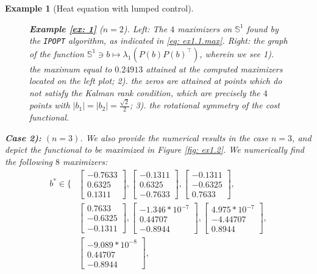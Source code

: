 \documentclass[journal,twoside,web]{ieeecolor}
\newtheorem{example}{Example}
\begin{document}
\begin{example}[Heat equation with lumped control]
\begin{figure}
	\caption{\textbf{Example \ref{ex: 1}} ($n=2$). \emph{Left}: The $4$ maximizers on $\mathbb{S}^1$ found by the \texttt{IPOPT} algorithm, as indicated in \eqref{eq: ex1.1.max}. \emph{Right}: the graph of the function $\mathbb{S}^1\ni b\mapsto\lambda_1(P(b)P(b)^\top)$, wherein we see 1). the maximum equal to $0.24913$ attained at the computed maximizers located on the left plot; 2). the zeros are attained at points which do not satisfy the Kalman rank condition, which are precisely the $4$ points with $|b_1|=|b_2|=\frac{\sqrt{2}}{2}$; 3). the rotational symmetry of the cost functional.}
	\label{fig: ex1.1}
	\end{figure}
	
	\smallskip
	\noindent \textbf{Case 2):} $(n=3)$. We also provide the numerical results in the case $n=3$, and depict the functional to be maximized in Figure \ref{fig: ex1.2}.  We numerically find the following $8$ maximizers: 
	\begin{align} \label{eq: ex1.2.max}
	b^* \in \Bigg\{&\begin{bmatrix} -0.7633\\ 0.6325\\0.1311\end{bmatrix}, 
\begin{bmatrix} -0.1311\\ 0.6325\\ -0.7633\end{bmatrix},
\begin{bmatrix} -0.1311\\ -0.6325\\ 0.7633\end{bmatrix},\nonumber\\
&\begin{bmatrix} 0.7633\\ -0.6325\\ -0.1311\end{bmatrix}, 
\begin{bmatrix} -1.346*10^{-7}\\ 0.44707\\ -0.8944\end{bmatrix}, \begin{bmatrix} 4.975*10^{-7}\\ -4.44707\\ 0.8944\end{bmatrix}, \nonumber\\
&\begin{bmatrix} -9.089*10^{-8}\\ 0.44707\\ -0.8944\end{bmatrix}, 

\end{align}
\end{example}
\end{document}
